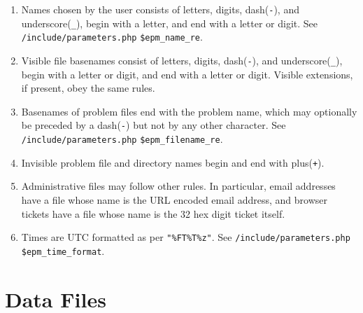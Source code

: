 \documentclass[12pt]{article}
\begin{document}
\begin{enumerate}
\item Names chosen by the user consists of letters, digits,
dash({\tt -}), and underscore({\tt \_}), begin with a letter,
and end with a letter or digit.
See {\tt /include/parameters.php} {\tt \$epm\_name\_re}.
\item Visible file basenames consist of letters, digits, dash({\tt -}), and
underscore({\tt \_}), begin with a letter or digit, and end
with a letter or digit.  Visible extensions, if present, obey the
same rules.
\item Basenames of problem files end with the
      problem name, which may optionally be preceded by a dash({\tt -}) but
      not by any other character.
      See {\tt /include/parameters.php} {\tt \$epm\_filename\_re}.
\item Invisible problem
      file and directory names begin and end with plus({\tt +}).
\item Administrative files may follow other rules.  In particular,
      email addresses have a file whose name is the URL encoded email
      address, and browser tickets have a file whose name is the
      32 hex digit ticket itself.
\item Times are UTC formatted as per {\tt "\%FT\%T\%z"}.
      See {\tt /include/parameters.php}\\ {\tt \$epm\_time\_format}.
\end{enumerate}


\section{Data Files}
\end{document}
